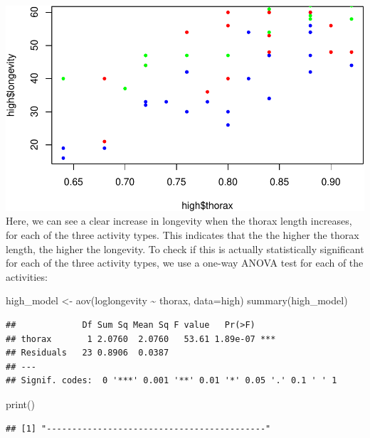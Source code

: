 \documentclass[
]{article}
\newenvironment{Shaded}{\begin{snugshade}}{\end{snugshade}}
\newcommand{\AttributeTok}[1]{\textcolor[rgb]{0.77,0.63,0.00}{#1}}
\newcommand{\FunctionTok}[1]{\textcolor[rgb]{0.00,0.00,0.00}{#1}}
\newcommand{\NormalTok}[1]{#1}
\newcommand{\OtherTok}[1]{\textcolor[rgb]{0.56,0.35,0.01}{#1}}
\newcommand{\SpecialCharTok}[1]{\textcolor[rgb]{0.00,0.00,0.00}{#1}}
\newcommand{\StringTok}[1]{\textcolor[rgb]{0.31,0.60,0.02}{#1}}
\begin{document}
\includegraphics{Assignment2_complete_files/figure-latex/unnamed-chunk-28-1.pdf}
Here, we can see a clear increase in longevity when the thorax length
increases, for each of the three activity types. This indicates that the
the higher the thorax length, the higher the longevity. To check if this
is actually statistically significant for each of the three activity
types, we use a one-way ANOVA test for each of the activities:

\begin{Shaded}
\begin{Highlighting}[]
\NormalTok{high\_model }\OtherTok{\textless{}{-}} \FunctionTok{aov}\NormalTok{(loglongevity }\SpecialCharTok{\textasciitilde{}}\NormalTok{ thorax, }\AttributeTok{data=}\NormalTok{high)}
\FunctionTok{summary}\NormalTok{(high\_model)}
\end{Highlighting}
\end{Shaded}

\begin{verbatim}
##             Df Sum Sq Mean Sq F value   Pr(>F)    
## thorax       1 2.0760  2.0760   53.61 1.89e-07 ***
## Residuals   23 0.8906  0.0387                     
## ---
## Signif. codes:  0 '***' 0.001 '**' 0.01 '*' 0.05 '.' 0.1 ' ' 1
\end{verbatim}

\begin{Shaded}
\begin{Highlighting}[]
\FunctionTok{print}\NormalTok{(}\StringTok{\textquotesingle{}{-}{-}{-}{-}{-}{-}{-}{-}{-}{-}{-}{-}{-}{-}{-}{-}{-}{-}{-}{-}{-}{-}{-}{-}{-}{-}{-}{-}{-}{-}{-}{-}{-}{-}{-}{-}{-}{-}{-}{-}{-}{-}{-}\textquotesingle{}}\NormalTok{)}
\end{Highlighting}
\end{Shaded}

\begin{verbatim}
## [1] "-------------------------------------------"
\end{verbatim}
\end{document}
